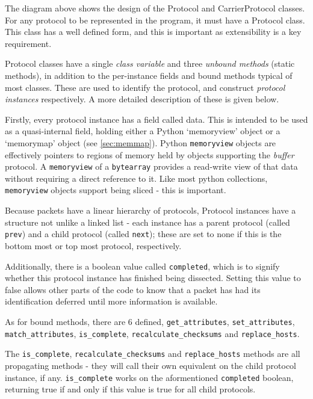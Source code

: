 \documentclass[10pt,a4paper,notitlepage]{report}
\begin{document}
The diagram above shows the design of the Protocol and CarrierProtocol classes. For any protocol to be represented in the program, it must have a Protocol class. This class has a well defined form, and this is important as extensibility is a key requirement.

Protocol classes have a single \emph{class variable} and three \emph{unbound methods} (static methods), in addition to the per-instance fields and bound methods typical of most classes. These are used to identify the protocol, and construct \emph{protocol instances} respectively. A more detailed description of these is given below.

Firstly, every protocol instance has a field called data. This is intended to be used as a quasi-internal field, holding either a Python `memoryview' object or a `memorymap' object (see \ref{sec:memmap}). Python \texttt{memoryview} objects are effectively pointers to regions of memory held by objects supporting the \emph{buffer} protocol. A \texttt{memoryview} of a \texttt{bytearray} provides a read-write view of that data without requiring a direct reference to it. Like most python collections, \texttt{memoryview} objects support being sliced - this is important.

Because packets have a linear hierarchy of protocols, Protocol instances have a structure not unlike a linked list - each instance has a parent protocol (called \texttt{prev}) and a child protocol (called \texttt{next}); these are set to none if this is the bottom most or top most protocol, respectively.

Additionally, there is a boolean value called \texttt{completed}, which is to signify whether this protocol instance has finished being dissected. Setting this value to false allows other parts of the code to know that a packet has had its identification deferred until more information is available.

As for bound methods, there are 6 defined, \texttt{get_attributes}, \texttt{set_attributes}, \texttt{match_attributes}, \texttt{is_complete}, \texttt{recalculate_checksums} and \texttt{replace_hosts}.

The \texttt{is_complete}, \texttt{recalculate_checksums} and \texttt{replace_hosts} methods are all propagating methods - they will call their own equivalent on the child protocol instance, if any. \texttt{is_complete} works on the aformentioned \texttt{completed} boolean, returning true if and only if this value is true for all child protocols.
\end{document}
